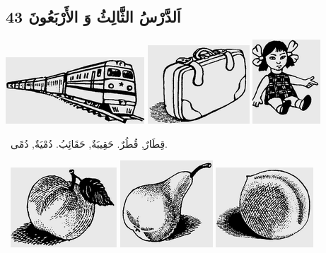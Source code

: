 \documentclass[a5paper]{article}
\begin{document}
\subsection[اَلدَّرْسُ الثَّالِثُ وَ الأَرْبَعُونَ 43]{اَلدَّرْسُ الثَّالِثُ وَ الأَرْبَعُونَ 43}
 \includegraphics[width=2.0417in,height=0.9791in]{images/MuhammadBagauddinprettified-img131.png}   \includegraphics[width=1.5in,height=1.1563in]{images/MuhammadBagauddinprettified-img132.png}   \includegraphics[width=1in,height=1.2398in]{images/MuhammadBagauddinprettified-img133.png} 

\ قِطَارٌ, قُطُرٌ. حَقِيبَةٌ, حَقَائِبُ. دُمْيَةٌ, دُمًى. 

\  \includegraphics[width=1.5626in,height=1.1772in]{images/MuhammadBagauddinprettified-img134.png}   \includegraphics[width=1.3646in,height=1.2811in]{images/MuhammadBagauddinprettified-img135.png}   \includegraphics[width=1.4374in,height=1.1772in]{images/MuhammadBagauddinprettified-img136.png} 
\end{document}

